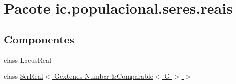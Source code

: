 \hypertarget{namespaceic_1_1populacional_1_1seres_1_1reais}{\section{Pacote ic.\-populacional.\-seres.\-reais}
\label{namespaceic_1_1populacional_1_1seres_1_1reais}
}
\subsection*{Componentes}
\begin{DoxyCompactItemize}
\item 
class \hyperlink{classic_1_1populacional_1_1seres_1_1reais_1_1_locus_real}{Locus\-Real}
\item 
class \hyperlink{classic_1_1populacional_1_1seres_1_1reais_1_1_ser_real_3_01_gextends_01_number_01_6_comparable_3_01_g_01_4_01_4}{Ser\-Real$<$ Gextends Number \&\-Comparable$<$ G $>$ $>$}
\end{DoxyCompactItemize}
